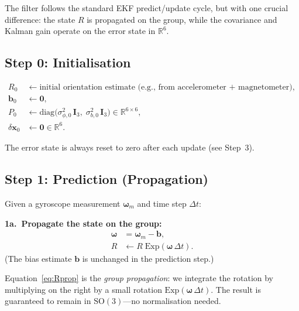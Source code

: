 \documentclass[11pt,letterpaper]{article}
\newcommand{\R}{\mathbb{R}}
\newcommand{\SO}{\mathrm{SO}(3)}
\newcommand{\expmap}{\mathrm{Exp}}
\newcommand{\eye}{\mathbf{I}}
\begin{document}
The filter follows the standard EKF predict/update cycle, but with
one crucial difference: the state $R$ is propagated on the group,
while the covariance and Kalman gain operate on the error state in
$\R^{6}$.

\subsection{Step 0: Initialisation}

\begin{align*}
  R_{0} &\leftarrow \text{initial orientation estimate
    (e.g., from accelerometer + magnetometer)}, \\
  \mathbf{b}_{0} &\leftarrow \mathbf{0}, \\
  P_{0} &\leftarrow \text{diag}\bigl(\sigma_{\phi,0}^{2}\,\eye_{3},\;
    \sigma_{b,0}^{2}\,\eye_{3}\bigr)
    \in \R^{6 \times 6}, \\
  \delta\mathbf{x}_{0} &\leftarrow \mathbf{0} \in \R^{6}.
\end{align*}

The error state is always reset to zero after each update (see
Step~3).

\subsection{Step 1: Prediction (Propagation)}

Given a gyroscope measurement $\bm{\omega}_m$ and time step
$\Delta t$:

\medskip
\noindent\textbf{1a.\ Propagate the state on the group:}
\begin{align}
  \bm{\omega} &= \bm{\omega}_m - \mathbf{b}, \label{eq:omega} \\
  R &\leftarrow R \;\expmap(\bm{\omega}\,\Delta t).
    \label{eq:Rprop}
\end{align}
(The bias estimate $\mathbf{b}$ is unchanged in the prediction
step.)

Equation~\eqref{eq:Rprop} is the \emph{group propagation}:
we integrate the rotation by multiplying on the right by a small
rotation $\expmap(\bm{\omega}\,\Delta t)$.  The result is
guaranteed to remain in $\SO$---no normalisation needed.
\end{document}
